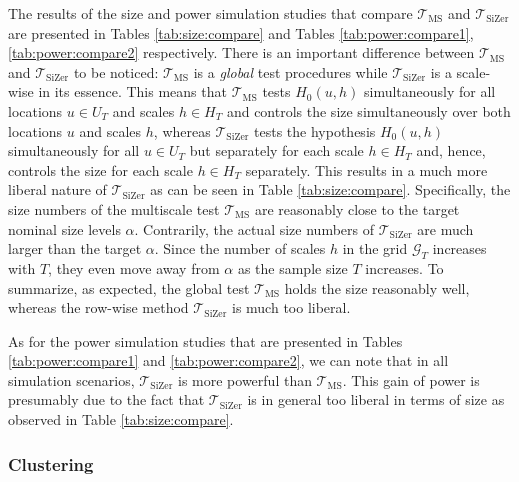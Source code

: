 \documentclass[a4paper,12pt]{article}
\begin{document}
The results of the size and power simulation studies that compare $\mathcal{T}_{\text{MS}}$ and $\mathcal{T}_{\text{SiZer}}$ are presented in Tables \ref{tab:size:compare} and Tables \ref{tab:power:compare1}, \ref{tab:power:compare2} respectively. There is an important difference between $\mathcal{T}_{\text{MS}}$ and $\mathcal{T}_{\text{SiZer}}$ to be noticed: $\mathcal{T}_{\text{MS}}$ is a \textit{global} test procedures while $\mathcal{T}_{\text{SiZer}}$ is a scale-wise in its essence. This means that $\mathcal{T}_{\text{MS}}$ tests $H_0(u,h)$ simultaneously for all locations $u \in U_T$ and scales $h \in H_T$ and controls the size simultaneously over both locations $u$ and scales $h$, whereas $\mathcal{T}_{\text{SiZer}}$ tests the hypothesis $H_0(u,h)$ simultaneously for all $u \in U_T$ but separately for each scale $h \in H_T$ and, hence, controls the size for each scale $h \in H_T$ separately. This results in a much more liberal nature of $\mathcal{T}_{\text{SiZer}}$ as can be seen in Table \ref{tab:size:compare}. Specifically, the size numbers of the multiscale test $\mathcal{T}_{\text{MS}}$ are reasonably close to the target nominal size levels $\alpha$. Contrarily, the actual size numbers of $\mathcal{T}_{\text{SiZer}}$ are much larger than the target $\alpha$. Since the number of scales $h$ in the grid $\mathcal{G}_T$ increases with $T$, they even move away from $\alpha$ as the sample size $T$ increases. To summarize, as expected, the global test $\mathcal{T}_{\text{MS}}$ holds the size reasonably well, whereas the row-wise method $\mathcal{T}_{\text{SiZer}}$ is much too liberal. 

As for the power simulation studies that are presented  in Tables \ref{tab:power:compare1} and \ref{tab:power:compare2}, we can note that in all simulation scenarios, $\mathcal{T}_{\text{SiZer}}$ is more powerful than $\mathcal{T}_{\text{MS}}$. This gain of power is presumably due to the fact that $\mathcal{T}_{\text{SiZer}}$ is in general too liberal in terms of size as observed in Table \ref{tab:size:compare}.


\subsubsection*{Clustering}
\end{document}

